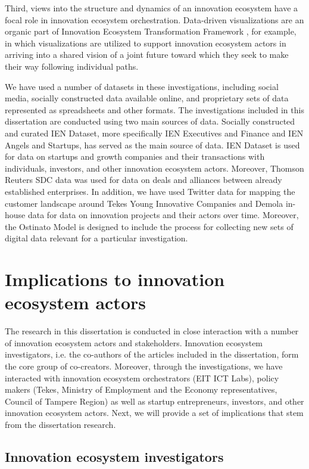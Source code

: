 Third, views into the structure and dynamics of an innovation ecosystem have a focal role in innovation ecosystem orchestration. Data-driven visualizations are an organic part of Innovation Ecosystem Transformation Framework \citep{Russell2011TransformingOrchestration}, for example, in which visualizations are utilized to support innovation ecosystem actors in arriving into a shared vision of a joint future toward which they seek to make their way following individual paths. 

We have used a number of datasets in these investigations, including social media, socially constructed data available online, and proprietary sets of data represented as spreadsheets and other formats. The investigations included in this dissertation are conducted using two main sources of data. Socially constructed and curated IEN Dataset, more specifically IEN Executives and Finance and IEN Angels and Startups, has served as the main source of data. IEN Dataset is used for data on startups and growth companies and their transactions with individuals, investors, and other innovation ecosystem actors. Moreover, Thomson Reuters SDC data was used for data on deals and alliances between already established enterprises. In addition, we have used Twitter data for mapping the customer landscape around Tekes Young Innovative Companies and Demola in-house data for data on innovation projects and their actors over time. Moreover, the Ostinato Model is designed to include the process for collecting new sets of digital data relevant for a particular investigation.

\section{Implications to innovation ecosystem actors} 

The research in this dissertation is conducted in close interaction with a number of innovation ecosystem actors and stakeholders. Innovation ecosystem investigators, i.e. the co-authors of the articles included in the dissertation, form the core group of co-creators. Moreover, through the investigations, we have interacted with innovation ecosystem orchestrators (EIT ICT Labs), policy makers (Tekes, Ministry of Employment and the Economy representatives, Council of Tampere Region) as well as startup entrepreneurs, investors, and other innovation ecosystem actors. Next, we will provide a set of implications that stem from the dissertation research.

\subsection{Innovation ecosystem investigators}

